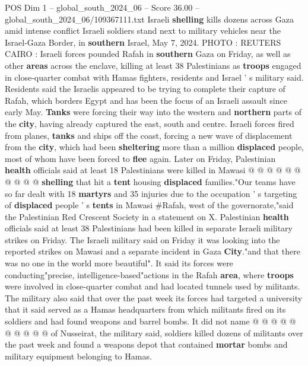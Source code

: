 \begin{textsample}{POS Dim 1 – global\_south\_2024\_06 – Score 36.00 – global\_south\_2024\_06/109367111.txt}  \label{ex:f1_pos_043}
Israeli \textbf{shelling} kills dozens across Gaza amid intense conflict Israeli soldiers stand next to military vehicles near the Israel-Gaza Border, in \textbf{southern} Israel, May 7, 2024.
PHOTO : REUTERS CAIRO : Israeli forces pounded Rafah in \textbf{southern} Gaza on Friday, as well as other \textbf{areas} across the enclave, killing at least 38 Palestinians as \textbf{troops} engaged in close-quarter combat with Hamas fighters, residents and Israel ' s military said.
Residents said the Israelis appeared to be trying to complete their capture of Rafah, which borders Egypt and has been the focus of an Israeli assault since early May. \textbf{Tanks} were forcing their way into the western and \textbf{northern} parts of the \textbf{city}, having already captured the east, south and centre.
Israeli forces fired from planes, \textbf{tanks} and ships off the coast, forcing a new wave of displacement from the \textbf{city}, which had been \textbf{sheltering} more than a million \textbf{displaced} people, most of whom have been forced to \textbf{flee} again.
Later on Friday, Palestinian \textbf{health} officials said at least 18 Palestinians were killed in Mawasi @ @ @ @ @ @ @ @ @ @ \textbf{shelling} that hit a \textbf{tent} housing \textbf{displaced} families."Our teams have so far dealt with 18 \textbf{martyrs} and 35 injuries due to the occupation ' s targeting of \textbf{displaced} people ' s \textbf{tents} in Mawasi \#Rafah, west of the governorate,"said the Palestinian Red Crescent Society in a statement on X.
Palestinian \textbf{health} officials said at least 38 Palestinians had been killed in separate Israeli military strikes on Friday.
The Israeli military said on Friday it was looking into the reported strikes on Mawasi and a separate incident in Gaza \textbf{City}."and that there was no one in the world more beautiful".
It said its forces were conducting"precise, intelligence-based"actions in the Rafah \textbf{area}, where \textbf{troops} were involved in close-quarter combat and had located tunnels used by militants.
The military also said that over the past week its forces had targeted a university that it said served as a Hamas headquarters from which militants fired on its soldiers and had found weapons and barrel bombs.
It did not name @ @ @ @ @ @ @ @ @ @ of Nusseirat, the military said, soldiers killed dozens of militants over the past week and found a weapons depot that contained \textbf{mortar} bombs and military equipment belonging to Hamas.

\end{textsample}
